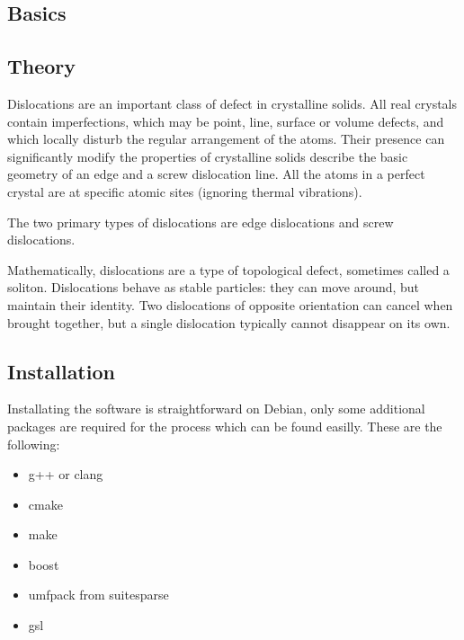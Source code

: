 \documentclass[12pt,a4paper]{article}
\theoremstyle{plain}
\begin{document}
\begin{multicols*}{2}

	\section{Basics}
	\vspace{0.2cm}

	\subsection{Theory}

	Dislocations are an important class of
	defect in crystalline solids.
	All real crystals contain imperfections,
	which may be point, line, surface or
	volume defects, and which locally disturb
	the regular arrangement of the atoms.
	Their presence can significantly modify
	the properties of crystalline solids
	describe the basic geometry of an edge and
	a screw dislocation line. All the atoms in
	a perfect crystal are at specific atomic
	sites (ignoring thermal vibrations). \cite{random}

	\vspace{0.1cm}

	The two primary types of dislocations
	are edge dislocations and screw dislocations.

	\vspace{0.1cm}

	Mathematically, dislocations are a
	type of topological defect, sometimes
	called a soliton. Dislocations behave as
	stable particles: they can move around,
	but maintain their identity. Two dislocations
	of opposite orientation can cancel when
	brought together, but a single dislocation
	typically cannot disappear on its own. \cite{wiki}

	\subsection{Installation}

	\par Installating the software is straightforward on Debian, only some additional packages are required
	for the process which can be found easilly. These are the following:

	\begin{itemize}
		\item g++ or clang
		\item cmake
		\item make
		\item boost
		\item umfpack from suitesparse
		\item gsl
	\end{itemize}


\end{multicols*}
\end{document}
